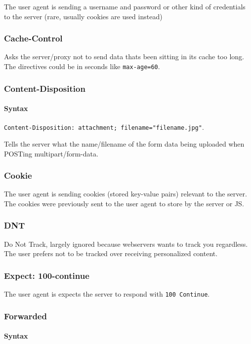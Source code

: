 \documentclass[../CMPUT-404-Notes.tex]{subfiles}
\begin{document}
The user agent is sending a username and password or other kind of credentials to the server (rare, usually cookies are used instead)

\subsubsection{Cache-Control}
Asks the server/proxy not to send data thats been sitting in its cache too long.
The directives could be in seconds like \texttt{max-age=60}.

\subsubsection{Content-Disposition}
\paragraph{Syntax} \texttt{Content-Disposition: attachment; filename="filename.jpg"}.

Tells the server what the name/filename of the form data being uploaded when POSTing multipart/form-data. 

\subsubsection{Cookie}
The user agent is sending cookies (stored key-value pairs) relevant to the server.
The cookies were previously sent to the user agent to store by the server or JS.

\subsubsection{DNT}
Do Not Track, largely ignored because webservers wants to track you regardless. 
The user prefers not to be tracked over receiving personalized content.

\subsubsection{Expect: 100-continue}
The user agent is expects the server to respond with \texttt{100 Continue}.

\subsubsection{Forwarded}

\paragraph{Syntax} 
\end{document}
